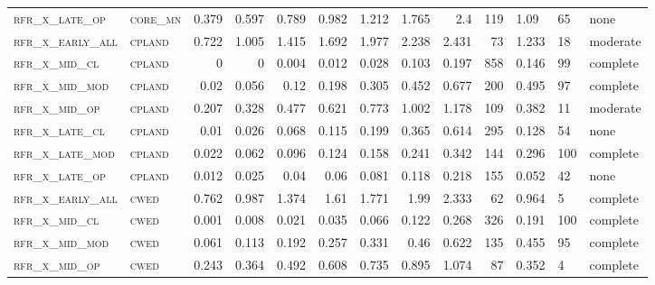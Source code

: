 \begin{landscape}
\begin{center}
\begin{footnotesize}
\begin{longtable}{llrrrrr|rrr}
\textsc{rfr\_x\_late\_op  } & \textsc{core\_mn  }   & 0.379   & 0.597   & 0.789   & 0.982    & 1.212    & 1.765    & 2.4      & 119    & 1.09          & 65            & none        \\
\textsc{rfr\_x\_early\_all} & \textsc{cpland    }   & 0.722   & 1.005   & 1.415   & 1.692    & 1.977    & 2.238    & 2.431    & 73     & 1.233         & 18            & moderate        \\
\textsc{rfr\_x\_mid\_cl   } & \textsc{cpland    }   & 0       & 0       & 0.004   & 0.012    & 0.028    & 0.103    & 0.197    & 858    & 0.146         & 99            & complete        \\
\textsc{rfr\_x\_mid\_mod  } & \textsc{cpland    }   & 0.02    & 0.056   & 0.12    & 0.198    & 0.305    & 0.452    & 0.677    & 200    & 0.495         & 97            & complete        \\
\textsc{rfr\_x\_mid\_op   } & \textsc{cpland    }   & 0.207   & 0.328   & 0.477   & 0.621    & 0.773    & 1.002    & 1.178    & 109    & 0.382         & 11            & moderate        \\
\textsc{rfr\_x\_late\_cl  } & \textsc{cpland    }   & 0.01    & 0.026   & 0.068   & 0.115    & 0.199    & 0.365    & 0.614    & 295    & 0.128         & 54            & none        \\
\textsc{rfr\_x\_late\_mod } & \textsc{cpland    }   & 0.022   & 0.062   & 0.096   & 0.124    & 0.158    & 0.241    & 0.342    & 144    & 0.296         & 100           & complete        \\
\textsc{rfr\_x\_late\_op  } & \textsc{cpland    }   & 0.012   & 0.025   & 0.04    & 0.06     & 0.081    & 0.118    & 0.218    & 155    & 0.052         & 42            & none        \\
\textsc{rfr\_x\_early\_all} & \textsc{cwed      }   & 0.762   & 0.987   & 1.374   & 1.61     & 1.771    & 1.99     & 2.333    & 62     & 0.964         & 5             & complete        \\
\textsc{rfr\_x\_mid\_cl   } & \textsc{cwed      }   & 0.001   & 0.008   & 0.021   & 0.035    & 0.066    & 0.122    & 0.268    & 326    & 0.191         & 100           & complete        \\
\textsc{rfr\_x\_mid\_mod  } & \textsc{cwed      }   & 0.061   & 0.113   & 0.192   & 0.257    & 0.331    & 0.46     & 0.622    & 135    & 0.455         & 95            & complete        \\
\textsc{rfr\_x\_mid\_op   } & \textsc{cwed      }   & 0.243   & 0.364   & 0.492   & 0.608    & 0.735    & 0.895    & 1.074    & 87     & 0.352         & 4             & complete        \\

\end{longtable}
\end{footnotesize}
\end{center}
\end{landscape}
